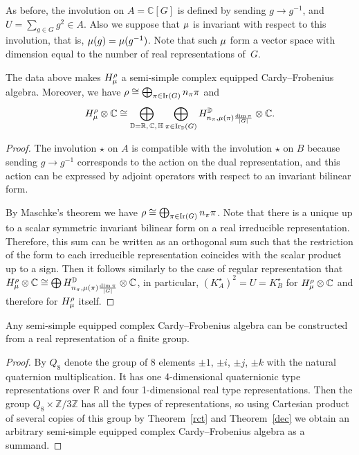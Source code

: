 \documentclass[pdftex]{sigma}
\def \Z {{\mathbb Z}}
\def \R {{\mathbb R}}
\def \C {{\mathbb C}}
\def \H {{\mathbb H}}
\def \Mu {{\bf \mu}}
\begin{document}
As before, the involution on $A=\C[G]$ is def\/ined by sending
$g \to g^{-1}$, and $U = \sum_{g \in G} g^2 \in A$. Also we suppose that
$\Mu$ is invariant with respect to this involution, that is,
$\Mu(g) = \Mu(g^{-1})$. Note that such $\Mu$ form a vector space
with dimension equal to the number of real representations of~$G$.



\begin{theorem}\label{rct}
The data above makes $H^\rho_\Mu$  a semi-simple complex  equipped Cardy--Frobenius
algebra.  Moreover, we have  $\rho \cong \bigoplus_{\pi \in {\rm Ir}(G)} n_{\pi} \pi$
and
\[
H^\rho_\Mu \otimes \C \cong \bigoplus_{\mathbb{D }= \R,\,\C,\,\H} \bigoplus_{\pi \in {\rm Ir}_\mathbb{D}(G)}
H^\mathbb{D}_{n_{\pi}, \Mu(\pi) \frac{\dim \pi}{|G|}} \otimes \C.
\]
\end{theorem}

\begin{proof}
The involution $\star$ on $A$ is compatible with
the involution $\star$ on $B$ because sending $g \to g^{-1}$ corresponds to the action on
the dual representation, and this action can be expressed by adjoint
operators with respect to an invariant bilinear form.

By Maschke's theorem we have $\rho \cong \bigoplus_{\pi \in {\rm Ir}(G)} n_{\pi} \pi$.
Note that there is a unique up to a scalar symmetric invariant bilinear form
on a real irreducible representation. Therefore,
this sum can be written as an orthogonal sum such that the restriction of
the form to
each irreducible representation coincides with the scalar product up to a sign.
Then it follows similarly to the case of regular representation that
$H^\rho_\Mu \otimes \C \cong   \bigoplus H^\mathbb{D}_{n_{\pi}, \Mu(\pi) \frac{\dim \pi}{|G|}} \otimes \C$,
in particular, $\left(K_A^\star\right)^2 = U = K_B^\star$ for $H^\rho_\Mu \otimes \C$ and therefore for
$H^\rho_\Mu$ itself.
\end{proof}


\begin{corollary}
Any semi-simple equipped complex Cardy--Frobenius algebra can be constructed from a real representation
of a finite group.
\end{corollary}

\begin{proof}
By $Q_8$ denote the group of 8 elements $\pm 1$, $\pm i$, $\pm j$, $\pm k$ with the natural quaternion multiplication.
It has one 4-dimensional quaternionic type representations over $\R$ and four 1-dimensional real type representations.
Then the group $Q_8 \times \Z/3\Z$ has all the types of representations, so using Cartesian product of several copies
of this group by Theorem~\ref{rct} and Theorem~\ref{dec} we obtain an
arbitrary semi-simple equipped complex Cardy--Frobenius algebra as a
summand.
\end{proof}
\end{document}
